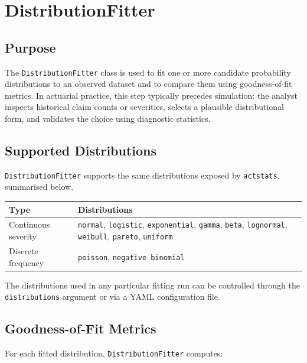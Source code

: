 \chapter{DistributionFitter}
\label{chap:distribution_fitter}

\section{Purpose}

The \texttt{DistributionFitter} class is used to fit one or more candidate
probability distributions to an observed dataset and to compare them using
goodness-of-fit metrics. In actuarial practice, this step typically
precedes simulation: the analyst inspects historical claim counts or
severities, selects a plausible distributional form, and validates the
choice using diagnostic statistics.

\section{Supported Distributions}

\texttt{DistributionFitter} supports the same distributions exposed by
\texttt{actstats}, summarised below.

\begin{center}
\begin{tabular}{ll}
\toprule
\textbf{Type} & \textbf{Distributions} \\
\midrule
Continuous severity & \texttt{normal}, \texttt{logistic},
                      \texttt{exponential}, \texttt{gamma}, \texttt{beta},
                      \texttt{lognormal}, \texttt{weibull},
                      \texttt{pareto}, \texttt{uniform} \\
Discrete frequency  & \texttt{poisson}, \texttt{negative binomial} \\
\bottomrule
\end{tabular}
\end{center}

The distributions used in any particular fitting run can be controlled
through the \texttt{distributions} argument or via a YAML configuration file.

\section{Goodness-of-Fit Metrics}

For each fitted distribution, \texttt{DistributionFitter} computes:

